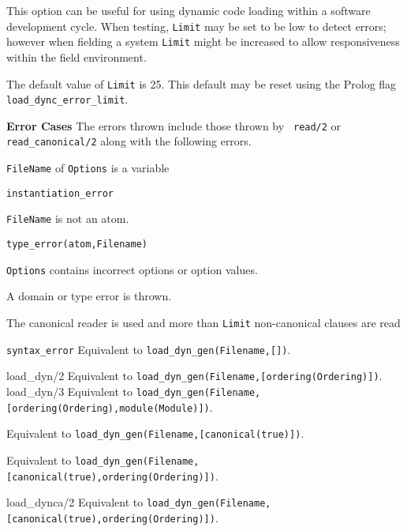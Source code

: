\begin{description}
\begin{itemize}
      This option can be useful for using dynamic code loading within
      a software development cycle.  When testing, {\tt Limit} may be
      set to be low to detect errors; however when fielding a system
      {\tt Limit} might be increased to allow responsiveness within
      the field environment.

      The default value of {\tt Limit} is 25.  This default may be
      reset using the Prolog flag {\tt load\_dync\_error\_limit}.
      \end{itemize}

    {\bf Error Cases} The errors thrown include those thrown by {\tt
      read/2} or {\tt read\_canonical/2} along with the following
    errors.

    \bi
\item 	{\tt FileName} of {\tt Options} is a variable
  \bi
\item 	{\tt instantiation\_error}
  \ei
\item 	{\tt FileName} is not an atom.
  \bi
\item 	{\tt type\_error(atom,Filename)}
  \ei
\item {\tt Options} contains incorrect options or option values.
  \bi
\item A domain or type error is thrown.
  \ei
\item The canonical reader is used and more than {\tt Limit}
  non-canonical clauses are read
  \bi
\item {\tt syntax\_error}
  \ei
  \ei
%
\label{load_dyn/1}
Equivalent to {\tt load\_dyn\_gen(Filename,[])}.

             {load\_dyn/2}\label{load_dyn/2}
Equivalent to {\tt load\_dyn\_gen(Filename,[ordering(Ordering)])}.
%
{load\_dyn/3}\label{load_dyn/3}
Equivalent to {\tt load\_dyn\_gen(Filename,[ordering(Ordering),module(Module)])}.

%
Equivalent to {\tt load\_dyn\_gen(Filename,[canonical(true)])}.


 \label{load_dync/2}

 \label{load_dync/3}
%
Equivalent to {\tt load\_dyn\_gen(Filename,[canonical(true),ordering(Ordering)])}.

             {load\_dynca/2}\label{load_dynca/2}
%
Equivalent to {\tt load\_dyn\_gen(Filename,[canonical(true),ordering(Ordering)])}.


\end{description}
